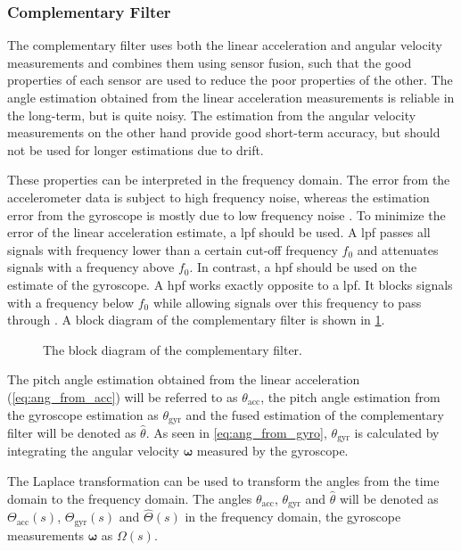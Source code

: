 \subsubsection{Complementary Filter}
The complementary filter uses both the linear acceleration and angular velocity measurements and combines them using sensor fusion, such that the good properties of each sensor are used to reduce the poor properties of the other.
The angle estimation obtained from the linear acceleration measurements is reliable in the long-term, but is quite noisy.
The estimation from the angular velocity measurements on the other hand provide good short-term accuracy, but should not be used for longer estimations due to drift.\par
These properties can be interpreted in the frequency domain.
The error from the accelerometer data is subject to high frequency noise, whereas the estimation error from the gyroscope is mostly due to low frequency noise \cite{2007Colton}.
To minimize the error of the linear acceleration estimate, a \gls{lpf} should be used.
A \gls{lpf} passes all signals with frequency lower than a certain cut-off frequency $f_0$ and attenuates signals with a frequency above $f_0$.
In contrast, a \gls{hpf} should be used on the estimate of the gyroscope.
A \gls{hpf} works exactly opposite to a \gls{lpf}.
It blocks signals with a frequency below $f_0$ while allowing signals over this frequency to pass through \cite{Lyons1996}. A block diagram of the complementary filter is shown in \cref{fig:tikz_complementary_filter}.\par
\begin{figure}[htb]
	\centering
	
	\caption[Block diagram of the complementary filter]{The block diagram of the complementary filter.}
	\label{fig:tikz_complementary_filter}
\end{figure}
The pitch angle estimation obtained from the linear acceleration (\cref{eq:ang_from_acc}) will be referred to as $\theta_\mathrm{acc}$, the pitch angle estimation from the gyroscope estimation as $\theta_\mathrm{gyr}$ and the fused estimation of the complementary filter will be denoted as $\hat{\theta}$.
As seen in \cref{eq:ang_from_gyro}, $\theta_\mathrm{gyr}$ is calculated by integrating the angular velocity $\boldsymbol{\omega} $ measured by the gyroscope.\par
The Laplace transformation can be used to transform the angles from the time domain to the frequency domain.
The angles $\theta_\mathrm{acc}$, $\theta_\mathrm{gyr}$ and $\hat{\theta}$ will be denoted as $\Theta_\mathrm{acc}(s)$, $\Theta_\mathrm{gyr}(s)$ and $\hat{\Theta}(s)$ in the frequency domain, the gyroscope measurements $\boldsymbol{\omega} $ as $\Omega (s)$.
